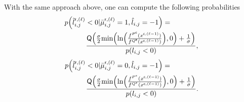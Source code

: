 \documentclass[journal]{IEEEtran}
\newcommand{\mep}{{x}}
\newcommand{\row}{\mathsf{r}}
\newcommand{\col}{\mathsf{c}}
\newcommand{\Q}{\mathsf{Q}}
\newcommand{\Pue}{P^{\mathsf{e}}}
\newcommand{\Que}{Q^{\mathsf{e}}}
\newcommand{\Puc}{P^{\mathsf{c}}}
\newcommand{\Quc}{Q^{\mathsf{c}}}
\newcommand{\Puep}{P^{\mathsf{\epsilon}}}
\newcommand{\Quep}{Q^{\mathsf{\epsilon}}}
\newcommand{\opt}{\tilde{l}}
\let\originalleft\left
\let\originalright\right
\renewcommand{\left}{\mathopen{}\mathclose\bgroup\originalleft}
\renewcommand{\right}{\aftergroup\egroup\originalright}
\begin{document}
With the same approach above, one can compute the following probabilities
\begin{align}\label{p_baysd2} 
& \nonumber {p\left(\opt_{i,j}^{\mathsf r, (\ell)} < 0|\bar \mu _{i,j}^{\row,(\ell )}=1,{{\hat l}_{i,j}=-1}\right)}= \\ &  ~~~~~~~~~\frac{{\Q\left( { \frac{\sigma}{2}\text{min}\left(\ln \left( \frac{f^{\Puc}(\mep^{\col,(\ell-1)})}{f^{\Que}(\mep^{\col,(\ell-1)})}\right),0\right)+\frac{1}{\sigma}} \right) }}{p(l_{i,j}<0)},
\end{align}
\begin{align}\label{p_baysd3} 
& \nonumber {p\left(\opt_{i,j}^{\mathsf r, (\ell)} < 0|\bar \mu _{i,j}^{\row,(\ell )}=0,{{\hat l}_{i,j}=-1}\right)}= \\ &  ~~~~~~~~~\frac{{\Q\left( { \frac{\sigma}{2}\text{min}\left(\ln \left(\frac{f^{\Puep}(\mep^{\col,(\ell-1)})}{f^{\Quep}(\mep^{\col,(\ell-1)})}\right),0\right)+\frac{1}{\sigma}} \right) }}{p(l_{i,j}<0)}.
\end{align}
\end{document}
